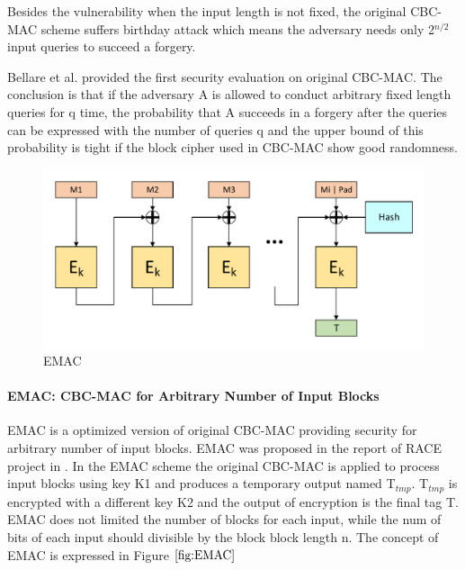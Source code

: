 \documentclass{article}
\begin{document}
Besides the vulnerability when the input length is not fixed, the original CBC-MAC scheme suffers birthday attack which means the adversary needs only 2$^{n/2}$ input queries to succeed a forgery. 

Bellare et al. provided the first security evaluation on original CBC-MAC\cite{cbc1994}. The conclusion is that if the adversary A is allowed to conduct arbitrary fixed length queries for q time, the probability that A succeeds in a forgery after the queries can be expressed with the number of queries q and the upper bound of this probability is tight if the block cipher used in CBC-MAC show good randomness.  

\begin{figure}[htbp]
\centering
\includegraphics[scale=0.5]{./diagrams/cmac.pdf}
\caption{EMAC}
\label{fig:EMAC}
\end{figure}
\paragraph{EMAC: CBC-MAC for Arbitrary Number of Input Blocks}
EMAC is a optimized version of original CBC-MAC providing security for arbitrary number of input blocks. EMAC was proposed in the report of RACE project in \cite{}. In the EMAC scheme the original CBC-MAC is applied to process input blocks using key K1 and produces a temporary output named T$_{tmp}$. T$_{tmp}$ is encrypted with a different key K2 and the output of encryption is the final tag T. EMAC does not limited the number of blocks for each input, while the num of bits of each input should divisible by the block block length n. The concept of EMAC is expressed in Figure $\ref{fig:EMAC}$ 
\end{document}
